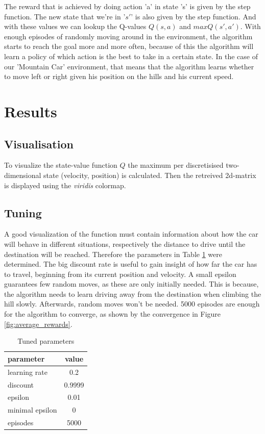 \documentclass{article}
\begin{document}
The reward that is achieved by doing action 'a' in state 's' is given by the step function. The new state that we're in '$s'$' is also given by the step function. And with these values we can lookup the Q-values $Q(s, a)$ and $max Q(s', a')$. 
With enough episodes of randomly moving around in the environment, the algorithm starts to reach the goal more and more often, because of this the algorithm will learn a policy of which action is the best to take in a certain state. In the case of our 'Mountain Car' environment, that means that the algorithm learns whether to move left or right given his position on the hills and his current speed.


\section{Results}

\subsection{Visualisation}
To visualize the state-value function $Q$ the maximum per discretisised two-dimensional state (velocity, position) is calculated. Then the retreived 2d-matrix is displayed using the \textit{viridis} colormap.

\subsection{Tuning}
A good visualization of the function must contain information about how the car will behave in different situations, respectively the distance to drive until the destination will be reached. Therefore the parameters in Table \ref{tab:tuned_params} were determined. The big discount rate is useful to gain insight of how far the car has to travel, beginning from its current position and velocity. A small epsilon guarantees few random moves, as these are only initially needed. This is because, the algorithm needs to learn driving away from the destination when climbing the hill slowly. Afterwards, random moves won't be needed. 5000 episodes are enough for the algorithm to converge, as shown by the convergence in Figure \ref{fig:average_rewards}.


\begin{table}
    \centering
    \begin{tabular}{l|c}
        parameter & value \\
        \hline
        learning rate & 0.2 \\
        discount & 0.9999 \\
        epsilon & 0.01 \\
        minimal epsilon & 0 \\
        episodes & 5000 \\
    \end{tabular}
    \caption{Tuned parameters}
    \label{tab:tuned_params}
\end{table}
\end{document}

